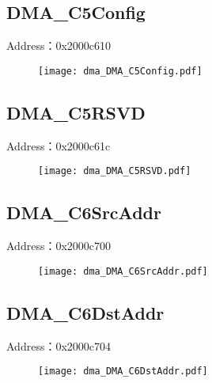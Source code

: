 \subsection{DMA\_C5Config}
\label{dma-DMA-C5Config}
Address：0x2000c610
 \begin{figure}[H]
\texttt{[image: dma\_DMA\_C5Config.pdf]}
\end{figure}

\subsection{DMA\_C5RSVD}
\label{dma-DMA-C5RSVD}
Address：0x2000c61c
 \begin{figure}[H]
\texttt{[image: dma\_DMA\_C5RSVD.pdf]}
\end{figure}

\subsection{DMA\_C6SrcAddr}
\label{dma-DMA-C6SrcAddr}
Address：0x2000c700
 \begin{figure}[H]
\texttt{[image: dma\_DMA\_C6SrcAddr.pdf]}
\end{figure}

\subsection{DMA\_C6DstAddr}
\label{dma-DMA-C6DstAddr}
Address：0x2000c704
 \begin{figure}[H]
\texttt{[image: dma\_DMA\_C6DstAddr.pdf]}
\end{figure}

